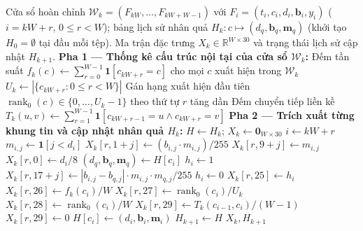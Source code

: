 \documentclass[12pt, a4paper, reqno, oneside]{book}
\begin{document}
\begin{algorithm}[htbp]
\caption{Trích xuất nhân quả biểu diễn cấu trúc 30 chiều cấp cửa sổ $\Phi(\mathcal{W}_k; H_k)$}\label{alg:causal-30d}
{\small\linespread{1.05}\selectfont
\begin{algorithmic}[1]
\Require Cửa sổ hoàn chỉnh $\mathcal{W}_k = (F_{kW}, \ldots, F_{kW+W-1})$ với $F_i = (t_i, c_i, d_i, \mathbf{b}_i, y_i)$ ($i = kW+r$, $0 \le r < W$); bảng lịch sử nhân quả $H_k : c \mapsto (d_q, \mathbf{b}_q, \mathbf{m}_q)$ (khởi tạo $H_0 = \emptyset$ tại đầu mỗi tệp).
\Ensure Ma trận đặc trưng $X_k \in \mathbb{R}^{W \times 30}$ và trạng thái lịch sử cập nhật $H_{k+1}$.
\State \textbf{Pha 1 --- Thống kê cấu trúc nội tại của cửa sổ $\mathcal{W}_k$:}
\State Đếm tần suất $f_k(c) \leftarrow \sum_{r=0}^{W-1} \mathbf{1}[c_{kW+r} = c]$ cho mọi $c$ xuất hiện trong $\mathcal{W}_k$
\State $U_k \leftarrow |\{c_{kW+r} : 0 \le r < W\}|$ 
\State Gán hạng xuất hiện đầu tiên $\operatorname{rank}_0(c) \in \{0, \ldots, U_k - 1\}$ theo thứ tự $r$ tăng dần
\State Đếm chuyển tiếp liền kề $T_k(u, v) \leftarrow \sum_{r=1}^{W-1} \mathbf{1}[c_{kW+r-1} = u \land c_{kW+r} = v]$
\State \textbf{Pha 2 --- Trích xuất từng khung tin và cập nhật nhân quả $H_k$:}
\State $H \leftarrow H_k$; \quad $X_k \leftarrow \mathbf{0}_{W \times 30}$
    \State $i \leftarrow kW + r$ 
        \State $m_{i,j} \leftarrow \mathbf{1}[j < d_i]$ 
        \State $X_k[r, 1 + j] \leftarrow (b_{i,j} \cdot m_{i,j}) / 255$ 
        \State $X_k[r, 9 + j] \leftarrow m_{i,j}$
    \EndFor
    \State $X_k[r, 0] \leftarrow d_i / 8$ 
     
        \State $(d_q, \mathbf{b}_q, \mathbf{m}_q) \leftarrow H[c_i]$
        \State $h_i \leftarrow 1$
            \State $X_k[r, 17 + j] \leftarrow |b_{i,j} - b_{q,j}| \cdot m_{i,j} \cdot m_{q,j} / 255$ 
        \EndFor
    \Else
        \State $h_i \leftarrow 0$ 
    \EndIf
    \State $X_k[r, 25] \leftarrow h_i$ 
    \State $X_k[r, 26] \leftarrow f_k(c_i) / W$ 
    \State $X_k[r, 27] \leftarrow \operatorname{rank}_0(c_i) / U_k$ 
    \State $X_k[r, 28] \leftarrow \operatorname{rank}_0(c_i) / W$ 
        \State $X_k[r, 29] \leftarrow T_k(c_{i-1}, c_i) / (W - 1)$ 
    \Else
        \State $X_k[r, 29] \leftarrow 0$ 
    \EndIf
    \State $H[c_i] \leftarrow (d_i, \mathbf{b}_i, \mathbf{m}_i)$ 
\EndFor
\State $H_{k+1} \leftarrow H$
\State \Return $X_k, H_{k+1}$
\end{algorithmic}}
\end{algorithm}
\end{document}
